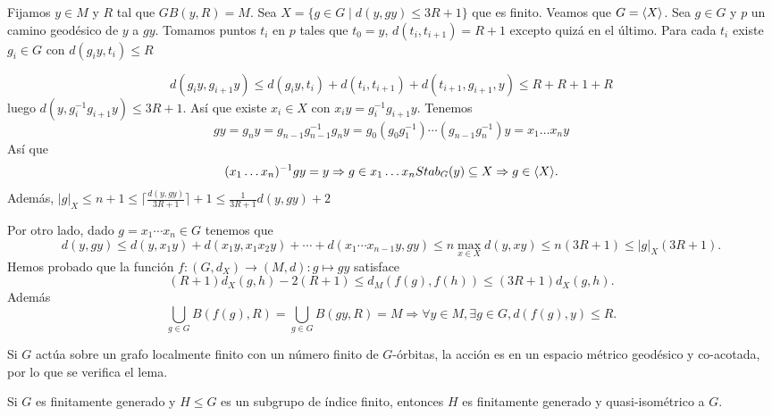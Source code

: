 \documentclass[twoside, 11pt]{article}
\begin{document}
\begin{dem}
Fijamos $y\in M$ y $R$ tal que $GB(y,R)=M$. Sea $X=\{g\in G\mid d(y,gy)\leq 3R+1\}$ que es finito. Veamos que $G=\langle{X}\rangle$. Sea $g\in G$ y $p$ un camino geodésico de $y$ a $gy$. Tomamos puntos $t_i$ en $p$ tales que $t_0=y$, $d(t_i,t_{i+1})=R+1$ excepto quizá en el último. Para cada $t_i$ existe $g_i\in G$ con $d(g_iy,t_i)\leq R$


\[
d(g_iy,g_{i+1}y)\leq d(g_iy,t_i)+d(t_i,t_{i+1})+d(t_{i+1}, g_{i+1},y)\leq R+R+1+R
\]
luego $d(y, g_i^{-1}g_{i+1}y)\leq 3R+1$. Así que existe $x_i\in X$ con $x_iy=g_i^{-1}g_{i+1}y$. Tenemos 
\[
gy=g_ny=g_{n-1}g_{n-1}^{-1}g_ny=g_0(g_0g_1^{-1})\cdots(g_{n-1}g_n^{-1})y=x_1\dots x_ny
\]
Así que
\[
(x_1\dots x_n)^{-1}gy=y\Rightarrow g\in x_1\dots x_n Stab_G(y)\subseteq X\Rightarrow g\in \langle{X}\rangle.
\]
Además, $|g|_X\leq n+1\leq \lceil \frac{d(y,gy)}{3R+1}\rceil +1\leq \frac{1}{3R+1}d(y,gy)+2$

Por otro lado, dado $g=x_1\cdots x_n\in G$ tenemos que 
\[
d(y,gy)\leq d(y, x_1y)+d(x_1y, x_1x_2y)+\cdots +d(x_1\cdots x_{n-1}y, gy)\leq n \max_{x\in X} d(y,xy)\leq n(3R+1)\leq |g|_X(3R+1).
\]
Hemos probado que la función $f:(G,d_X)\to (M,d): g\mapsto gy$ satisface
\[
(R+1)d_X(g,h)-2(R+1)\leq d_M(f(g),f(h))\leq (3R+1)d_X(g,h).
\]
Además 
\[
\bigcup_{g\in G}B(f(g),R)=\bigcup_{g\in G} B(gy, R)=M\Rightarrow \forall y\in M,\exists g\in G, d(f(g),y)\leq R.
\]
\QED
\end{dem}
\begin{ej}
Si $G$ actúa sobre un grafo localmente finito con un número finito de $G$-órbitas, la acción es en un espacio métrico geodésico y co-acotada, por lo que se verifica el lema. 
\end{ej}
\begin{coro}
Si $G$ es finitamente generado y $H\leq G$ es un subgrupo de índice finito, entonces $H$ es finitamente generado y quasi-isométrico a $G$. 
\end{coro}
\end{document}
